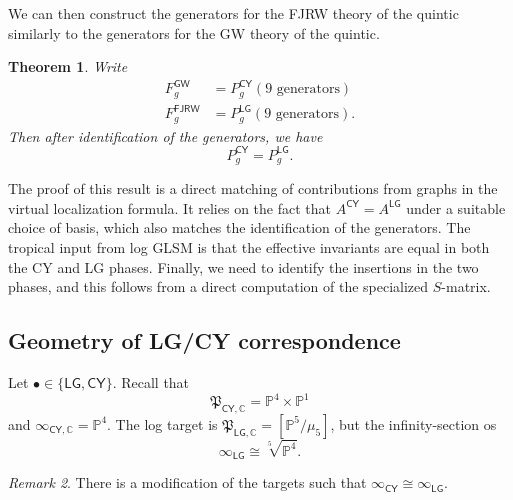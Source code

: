 \documentclass[10pt]{amsart}
\newtheorem{thm}{Theorem}[section]
\theoremstyle{definition}
\theoremstyle{remark}
\newtheorem{rmk}[thm]{Remark}
\theoremstyle{plain}
\theoremstyle{definition}
\theoremstyle{remark}
\newcommand{\C}{\mathbb{C}}
\renewcommand{\P}{\mathbb{P}}
\newcommand{\mf}[1]{\mathfrak{#1}}
\newcommand{\ms}[1]{\mathsf{#1}}
\newcommand{\1}{\mathbf{1}}
\newcommand{\2}{\mathbf{2}}
\newcommand{\3}{\mathbf{3}}
\newcommand{\GW}{\ms{GW}}
\newcommand{\FJRW}{\ms{FJRW}}
\newcommand{\LG}{\ms{LG}}
\newcommand{\CY}{\ms{CY}}
\begin{document}
We can then construct the generators for the FJRW theory of the quintic similarly to the generators for the GW theory of the quintic.
\begin{thm}
    Write
    \begin{align*}
        F_g^{\GW} &= P_g^{\ms{CY}} (\text{$9$ generators}) \\
        F_g^{\FJRW} &= P_g^{\LG}(\text{$9$ generators}).
    \end{align*}
    Then after identification of the generators, we have
    \[ P_g^{\ms{CY}} = P_g^{\LG}. \]
\end{thm}

The proof of this result is a direct matching of contributions from graphs in the virtual localization formula. It relies on the fact that $A^{\ms{CY}} = A^{\ms{LG}}$ under a suitable choice of basis, which also matches the identification of the generators. The tropical input from log GLSM is that the effective invariants are equal in both the CY and LG phases. Finally, we need to identify the insertions in the two phases, and this follows from a direct computation of the specialized $S$-matrix.

\subsection{Geometry of LG/CY correspondence}%
\label{sub:Geometry of LG/CY correspondence}

Let $\bullet \in \{\LG,\CY\}$. Recall that
\[ \mf{P}_{\CY, \C} = \P^4 \times \P^1 \]
and $\infty_{\CY, \C} = \P^4$. The log target is $\mf{P}_{\LG, \C} = [\P^5/\mu_5]$, but the infinity-section os
\[ \infty_{\LG} \cong \sqrt[5]{\P^4}. \]

\begin{rmk}
    There is a modification of the targets such that $\infty_{\CY} \cong \infty_{\LG}$.
\end{rmk}
\end{document}
